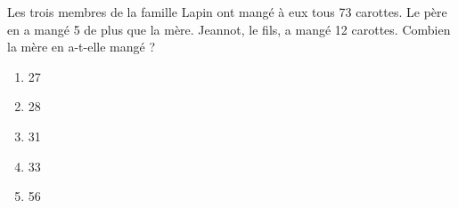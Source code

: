 Les trois membres de la famille Lapin ont mangé à eux tous 73 carottes. Le père en a mangé 5 de plus que la mère. Jeannot, le fils, a mangé 12 carottes. Combien la mère en a-t-elle mangé ?
\begin{multicols}{5}
  \begin{enumerate}[A/]
  \item 27
  \item 28
  \item 31
  \item 33
  \item 56
  \end{enumerate}
\end{multicols}